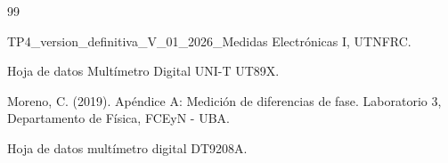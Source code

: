 \documentclass{plantilla}
\begin{document}




\begin{thebibliography}{99}

TP4\_version\_definitiva\_V\_01\_2026\_Medidas Electrónicas I, UTNFRC.

Hoja de datos Multímetro Digital UNI-T UT89X.

Moreno, C. (2019). Apéndice A: Medición de diferencias de fase. Laboratorio 3, Departamento de Física, FCEyN - UBA.

Hoja de datos multímetro digital DT9208A.

\end{thebibliography}
\end{document}
